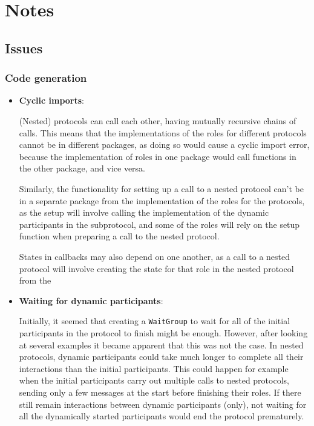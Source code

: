 \documentclass[12pt,twoside]{report}
\begin{document}

\chapter{Notes}

\section{Issues}
\subsection{Code generation}
\begin{itemize}
    \item \textbf{Cyclic imports}:
    
    
    (Nested) protocols can call each other, having mutually recursive chains of calls. This means that the implementations of the roles for different protocols cannot be in different packages, as doing so would cause a cyclic import error, because the implementation of roles in one package would call functions in the other package, and vice versa.
    
    Similarly, the functionality for setting up a call to a nested protocol can't be in a separate package from the implementation of the roles for the protocols, as the setup will involve calling the implementation of the dynamic participants in the subprotocol, and some of the roles will rely on the setup function when preparing a call to the nested protocol. 
    
    States in callbacks may also depend on one another, as a call to a nested protocol will involve creating the state for that role in the nested protocol from the 
    
    \item \textbf{Waiting for dynamic participants}:
    
    Initially, it seemed that creating a \texttt{WaitGroup} to wait for all of the initial participants in the protocol to finish might be enough. However, after looking at several examples it became apparent that this was not the case. In nested protocols, dynamic participants could take much longer to complete all their interactions than the initial participants. This could happen for example when the initial participants carry out multiple calls to nested protocols, sending only a few messages at the start before finishing their roles. If there still remain interactions between dynamic participants (only), not waiting for all the dynamically started participants would end the protocol prematurely. 
    

\end{itemize}
\end{document}
